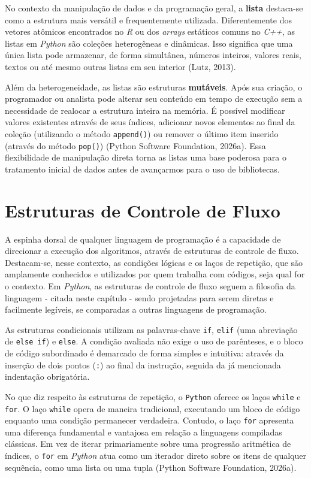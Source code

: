 \documentclass[
  brazilian,
  letterpaper,
  DIV=11,
  numbers=noendperiod]{scrreprt}
\begin{document}
No contexto da manipulação de dados e da programação geral, a
\textbf{lista} destaca-se como a estrutura mais versátil e
frequentemente utilizada. Diferentemente dos vetores atômicos
encontrados no \emph{R} ou dos \emph{arrays} estáticos comuns no
\emph{C++}, as listas em \emph{Python} são coleções heterogêneas e
dinâmicas. Isso significa que uma única lista pode armazenar, de forma
simultânea, números inteiros, valores reais, textos ou até mesmo outras
listas em seu interior (Lutz, 2013).

Além da heterogeneidade, as listas são estruturas \textbf{mutáveis}.
Após sua criação, o programador ou analista pode alterar seu conteúdo em
tempo de execução sem a necessidade de realocar a estrutura inteira na
memória. É possível modificar valores existentes através de seus
índices, adicionar novos elementos ao final da coleção (utilizando o
método \texttt{append()}) ou remover o último item inserido (através do
método \texttt{pop()}) (Python Software Foundation, 2026a). Essa
flexibilidade de manipulação direta torna as listas uma base poderosa
para o tratamento inicial de dados antes de avançarmos para o uso de
bibliotecas.

\section{Estruturas de Controle de
Fluxo}\label{estruturas-de-controle-de-fluxo}

A espinha dorsal de qualquer linguagem de programação é a capacidade de
direcionar a execução dos algoritmos, através de estruturas de controle
de fluxo. Destacam-se, nesse contexto, as condições lógicas e os laços
de repetição, que são amplamente conhecidos e utilizados por quem
trabalha com códigos, seja qual for o contexto. Em \emph{Python}, as
estruturas de controle de fluxo seguem a filosofia da linguagem - citada
neste capítulo - sendo projetadas para serem diretas e facilmente
legíveis, se comparadas a outras linguagens de programação.

As estruturas condicionais utilizam as palavras-chave \texttt{if},
\texttt{elif} (uma abreviação de \texttt{else\ if}) e \texttt{else}. A
condição avaliada não exige o uso de parênteses, e o bloco de código
subordinado é demarcado de forma simples e intuitiva: através da
inserção de dois pontos (\texttt{:}) ao final da instrução, seguida da
já mencionada indentação obrigatória.

No que diz respeito às estruturas de repetição, o \texttt{Python}
oferece os laços \texttt{while} e \texttt{for}. O laço \texttt{while}
opera de maneira tradicional, executando um bloco de código enquanto uma
condição permanecer verdadeira. Contudo, o laço \texttt{for} apresenta
uma diferença fundamental e vantajosa em relação a linguagens compiladas
clássicas. Em vez de iterar primariamente sobre uma progressão
aritmética de índices, o \texttt{for} em \emph{Python} atua como um
iterador direto sobre os itens de qualquer sequência, como uma lista ou
uma tupla (Python Software Foundation, 2026a).
\end{document}
